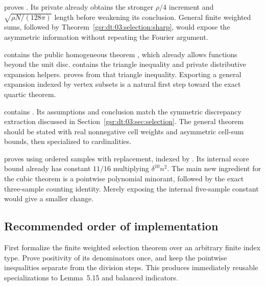 \documentclass[11pt,letterpaper]{article}
\numberwithin{equation}{section}
\theoremstyle{definition}
\theoremstyle{remark}
\newcommand{\1}{\mathbf 1}
\begin{document}
\begin{description}[style=nextline,leftmargin=1em]
\item[Partition discrepancy and Fourier increment.]
 proves
. Its private
 already obtains the stronger $\rho/4$
increment and $\sqrt{\rho N/(128\pi)}$ length before weakening its
conclusion. General finite weighted sums, followed by
Theorem~\ref{gsr:dt:03:selection:sharp}, would expose the asymmetric information
without repeating the Fourier argument.

\item[Multilinear norms and cube expansion.]
 contains the public homogeneous theorem
, which already allows functions beyond the
unit disc.  contains the triangle inequality
and private distributive expansion helpers.
 proves  from that
triangle inequality. Exporting a general expansion indexed by vertex
subsets is a natural first step toward the exact quartic theorem.

\item[Selection from many cells.]
 contains . Its assumptions
and conclusion match the symmetric discrepancy extraction discussed in
Section~\ref{gsr:dt:03:sec:selection}. The general theorem should be stated with
real nonnegative cell weights and asymmetric cell-sum bounds, then
specialized to cardinalities.

\item[Dependent random choice.]
 proves  using ordered
samples with replacement, indexed by . Its internal score
bound already has constant $11/16$ multiplying $\delta^{10}n^2$.
The main new ingredient for the cubic theorem is a pointwise polynomial
minorant, followed by the exact three-sample counting identity. Merely
exposing the internal five-sample constant would give a smaller change.
\end{description}

\subsection{Recommended order of implementation}

First formalize the finite weighted selection theorem over an arbitrary
finite index type. Prove positivity of its denominators once, and keep
the pointwise inequalities separate from the division steps. This
produces immediately reusable specializations to Lemma~5.15 and balanced
indicators.
\end{document}
